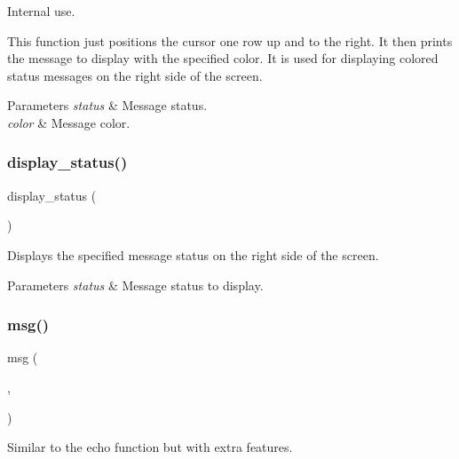 Internal use. 

This function just positions the cursor one row up and to the right. It then prints the message to display with the specified color. It is used for displaying colored status messages on the right side of the screen. 
\begin{DoxyParams}{Parameters}
{\em status} & Message status. \\
\hline
{\em color} & Message color. \\
\hline
\end{DoxyParams}
\mbox{\label{group__message_ga96f4577ff4b52262f9a0caa7385a354b}} 
\subsubsection{\texorpdfstring{display\+\_\+status()}{display\_status()}}
{\footnotesize\ttfamily display\+\_\+status (\begin{DoxyParamCaption}\item[{status}]{ }\end{DoxyParamCaption})}



Displays the specified message status on the right side of the screen. 


\begin{DoxyParams}{Parameters}
{\em status} & Message status to display. \\
\hline
\end{DoxyParams}
\mbox{\label{group__message_ga0a802cfb26922315f8503676672fcea9}} 
\subsubsection{\texorpdfstring{msg()}{msg()}}
{\footnotesize\ttfamily msg (\begin{DoxyParamCaption}\item[{message}]{,  }\item[{color}]{ }\end{DoxyParamCaption})}



Similar to the \textquotesingle{}echo\textquotesingle{} function but with extra features. 


